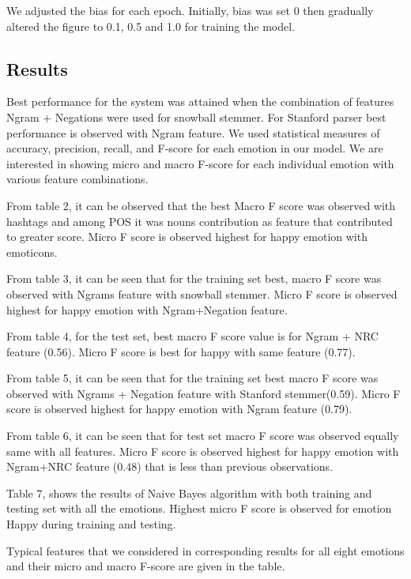 \documentclass[11pt]{article}
\begin{document}
{  We adjusted the bias for each epoch. Initially, bias was set 0 then gradually altered the figure to 0.1, 0.5 and 1.0 for training the model.
  
  
  
  \subsection{Results}
  
  Best performance for the system was attained when the combination of features Ngram + Negations were used for snowball stemmer.
  For Stanford parser best performance is observed with Ngram feature. We used statistical measures of accuracy, precision, recall, and F-score for each emotion in our model. We are interested in showing micro and macro F-score for each individual emotion with various feature combinations.
  
   From table 2, it can be observed that the best Macro F score was observed with hashtags and among POS it was nouns contribution as feature that contributed to greater score. Micro F score is observed highest for happy emotion with emoticons. 
   
  From table 3, it can be seen that for the training set best, macro F score was observed with Ngrams feature with snowball stemmer. Micro F score is observed highest for happy emotion with Ngram+Negation feature. 
  
  From table 4, for the test set, best macro F score value is for Ngram +  NRC feature (0.56). Micro F score is best for happy with same feature (0.77).
  
  From table 5, it can be seen that for the training set best macro F score was observed with Ngrams + Negation feature with Stanford stemmer(0.59). Micro F score is observed highest for happy emotion with Ngram feature (0.79). 
  
  From table 6, it can be seen that for test set macro F score was observed equally same with all features. Micro F score is observed highest for happy emotion with Ngram+NRC feature (0.48) that is less than previous observations.
  
  Table 7, shows the results of Naive Bayes algorithm with both training and testing set with all the emotions. Highest micro F score is observed for emotion Happy during training and testing.
   
  
  
  
  Typical features that we considered in corresponding results for all eight
  emotions and their micro and macro F-score are given in the table.
  
}
\end{document}
